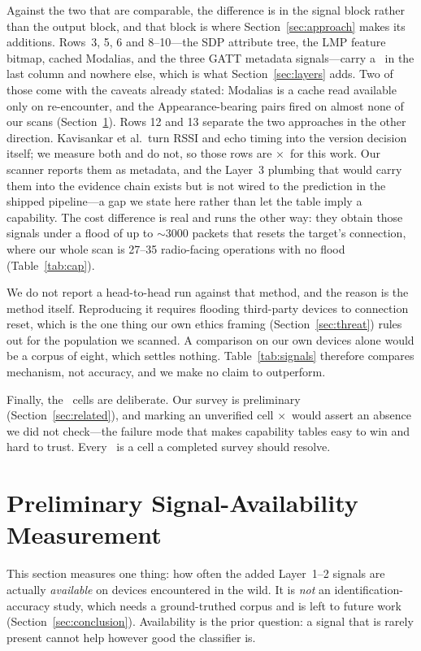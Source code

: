 \documentclass[conference]{IEEEtran}
\newcommand{\yes}{\checkmark}
\newcommand{\no}{$\times$}
\newcommand{\unk}{\textendash}
\begin{document}
Against the two that are comparable, the difference is in the signal block
rather than the output block, and that block is where
Section~\ref{sec:approach} makes its additions. Rows~3, 5, 6 and 8--10---the SDP attribute tree,
the LMP feature bitmap, cached Modalias, and the three GATT metadata
signals---carry a \yes\ in the last column and nowhere else, which is what
Section~\ref{sec:layers} adds. Two of those come with the caveats already
stated: Modalias is a cache read available only on re-encounter, and the
Appearance-bearing pairs fired on almost none of our scans
(Section~\ref{sec:eval}). Rows 12 and 13 separate the two approaches in the
other direction. Kavisankar et al.\ turn RSSI and echo timing into the version
decision itself; we measure both and do not, so those rows are \no\ for this
work. Our scanner reports them as metadata, and the Layer~3 plumbing that
would carry them into the evidence chain exists but is not wired to the
prediction in the shipped pipeline---a gap we state here rather than let the
table imply a capability. The cost difference is real and runs the other way:
they obtain those signals under a flood of up to $\sim$3000 packets that resets
the target's connection, where our whole scan is 27--35 radio-facing
operations with no flood (Table~\ref{tab:cap}).

We do not report a head-to-head run against that method, and the reason is the
method itself. Reproducing it requires flooding third-party devices to
connection reset, which is the one thing our own ethics framing
(Section~\ref{sec:threat}) rules out for the population we scanned. A
comparison on our own devices alone would be a corpus of eight, which settles
nothing. Table~\ref{tab:signals} therefore compares mechanism, not accuracy,
and we make no claim to outperform.

Finally, the \unk\ cells are deliberate. Our survey is preliminary
(Section~\ref{sec:related}), and marking an unverified cell \no\ would assert
an absence we did not check---the failure mode that makes capability tables
easy to win and hard to trust. Every \unk\ is a cell a completed survey should
resolve.

\section{Preliminary Signal-Availability Measurement}\label{sec:eval}
This section measures one thing: how often the added Layer~1--2 signals are
actually \emph{available} on devices encountered in the wild. It is
\emph{not} an identification-accuracy study, which needs a ground-truthed
corpus and is left to future work (Section~\ref{sec:conclusion}).
Availability is the prior question: a signal that is rarely present cannot
help however good the classifier is.
\end{document}
